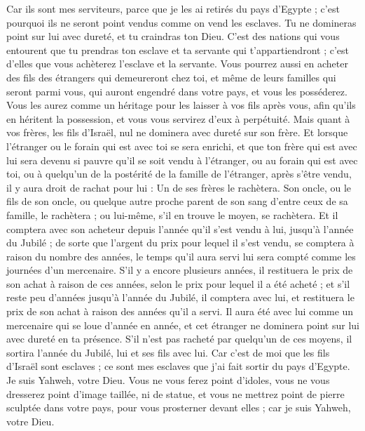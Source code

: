 \begin{multicols}{2}
Car ils sont mes serviteurs, parce que je les ai retirés du pays d'Egypte ; c'est pourquoi ils ne seront point vendus comme on vend les esclaves.
Tu ne domineras point sur lui avec dureté, et tu craindras ton Dieu.
C'est des nations qui vous entourent que tu prendras ton esclave et ta servante qui t'appartiendront ; c'est d'elles que vous achèterez l'esclave et la servante.
Vous pourrez aussi en acheter des fils des étrangers qui demeureront chez toi, et même de leurs familles qui seront parmi vous, qui auront engendré dans votre pays, et vous les posséderez.
Vous les aurez comme un héritage pour les laisser à vos fils après vous, afin qu'ils en héritent la possession, et vous vous servirez d'eux à perpétuité. Mais quant à vos frères, les fils d'Israël, nul ne dominera avec dureté sur son frère.
Et lorsque l'étranger ou le forain qui est avec toi se sera enrichi, et que ton frère qui est avec lui sera devenu si pauvre qu'il se soit vendu à l'étranger, ou au forain qui est avec toi, ou à quelqu'un de la postérité de la famille de l'étranger,
après s'être vendu, il y aura droit de rachat pour lui : Un de ses frères le rachètera.
Son oncle, ou le fils de son oncle, ou quelque autre proche parent de son sang d'entre ceux de sa famille, le rachètera ; ou lui-même, s'il en trouve le moyen, se rachètera.
Et il comptera avec son acheteur depuis l'année qu'il s'est vendu à lui, jusqu'à l'année du Jubilé ; de sorte que l'argent du prix pour lequel il s'est vendu, se comptera à raison du nombre des années, le temps qu'il aura servi lui sera compté comme les journées d'un mercenaire.
S'il y a encore plusieurs années, il restituera le prix de son achat à raison de ces années, selon le prix pour lequel il a été acheté ;
et s'il reste peu d'années jusqu'à l'année du Jubilé, il comptera avec lui, et restituera le prix de son achat à raison des années qu'il a servi.
Il aura été avec lui comme un mercenaire qui se loue d'année en année, et cet étranger ne dominera point sur lui avec dureté en ta présence.
S'il n'est pas racheté par quelqu'un de ces moyens, il sortira l'année du Jubilé, lui et ses fils avec lui.
Car c'est de moi que les fils d'Israël sont esclaves ; ce sont mes esclaves que j'ai fait sortir du pays d'Egypte. Je suis Yahweh, votre Dieu.
\VerseOne{}Vous ne vous ferez point d'idoles, vous ne vous dresserez point d'image taillée, ni de statue, et vous ne mettrez point de pierre sculptée dans votre pays, pour vous prosterner devant elles ; car je suis Yahweh, votre Dieu.

\end{multicols}

